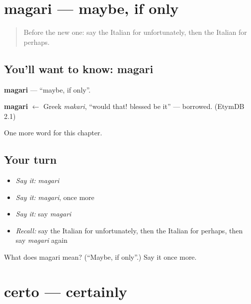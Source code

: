 \section[magari]{magari — maybe, if only}

\label{lesson:IT-C217-magari}



\begin{quote}
Before the new one: say the Italian for unfortunately, then the Italian for perhaps.
\end{quote}

\subsection*{You'll want to know: magari}
\textbf{magari} — \textquotedblleft{}maybe, if only\textquotedblright{}.

\begin{cousinweb}
\textbf{magari} $\leftarrow$ Greek \emph{makari}, \textquotedblleft{}would that! blessed be it\textquotedblright{} — borrowed. (EtymDB 2.1)
\end{cousinweb}

\begin{grammarlens}[title={What you've built}]
One more word for this chapter.
\end{grammarlens}

\subsection*{Your turn}
\begin{itemize}
\raggedright
  \item \emph{Say it:} \emph{magari}
  \item \emph{Say it:} \emph{magari}, once more
  \item \emph{Say it:} say \emph{magari}
  \item \emph{Recall:} say the Italian for unfortunately, then the Italian for perhaps, then say \emph{magari} again
\end{itemize}

\begin{tcolorbox}[breakable,colback=teal!4,colframe=teal!35!black,title={Before you move on}]
What does magari mean? (\textquotedblleft{}Maybe, if only\textquotedblright{}.) Say it once more.
\end{tcolorbox}
\section[certo]{certo — certainly}

